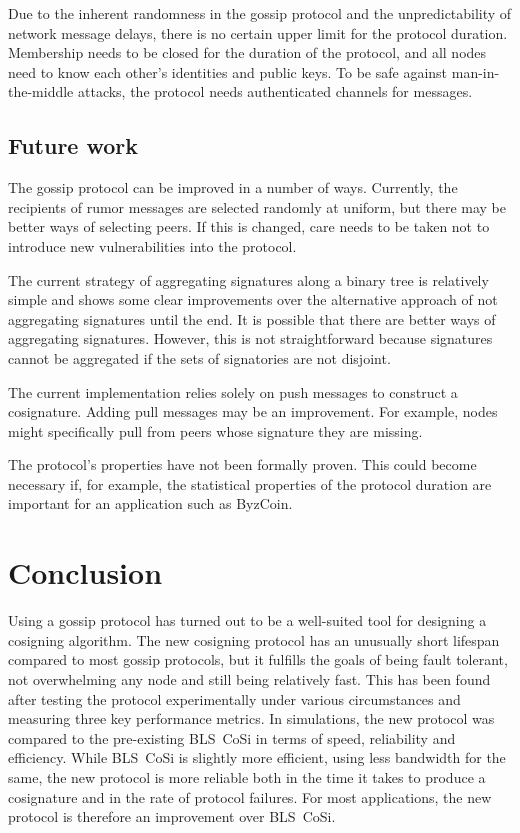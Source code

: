 Due to the inherent randomness in the gossip protocol and the unpredictability of network message delays, there is no certain upper limit for the protocol duration.
Membership needs to be closed for the duration of the protocol, and all nodes need to know each other's identities and public keys.
To be safe against man-in-the-middle attacks, the protocol needs authenticated channels for messages.


\subsection{Future work}

The gossip protocol can be improved in a number of ways.
Currently, the recipients of rumor messages are selected randomly at uniform, but there may be better ways of selecting peers.
If this is changed, care needs to be taken not to introduce new vulnerabilities into the protocol.

The current strategy of aggregating signatures along a binary tree is relatively simple and shows some clear improvements over the alternative approach of not aggregating signatures until the end.
It is possible that there are better ways of aggregating signatures.
However, this is not straightforward because signatures cannot be aggregated if the sets of signatories are not disjoint.

The current implementation relies solely on push messages to construct a cosignature.
Adding pull messages may be an improvement.
For example, nodes might specifically pull from peers whose signature they are missing.

The protocol's properties have not been formally proven.
This could become necessary if, for example, the statistical properties of the protocol duration are important for an application such as ByzCoin.


\section{Conclusion}
\label{conclusion}

Using a gossip protocol has turned out to be a well-suited tool for designing a cosigning algorithm.
The new cosigning protocol has an unusually short lifespan compared to most gossip protocols, but it fulfills the goals of being fault tolerant, not overwhelming any node and still being relatively fast.
This has been found after testing the protocol experimentally under various circumstances and measuring three key performance metrics.
In simulations, the new protocol was compared to the pre-existing BLS~CoSi in terms of speed, reliability and efficiency.
While BLS~CoSi is slightly more efficient, using less bandwidth for the same, the new protocol is more reliable both in the time it takes to produce a cosignature and in the rate of protocol failures.
For most applications, the new protocol is therefore an improvement over BLS~CoSi.

